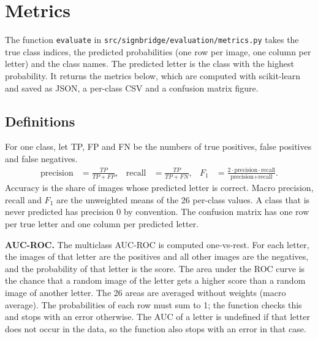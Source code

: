 \section{Metrics}
\label{sec:metrics}

The function \texttt{evaluate} in \texttt{src/signbridge/evaluation/metrics.py} takes the true class indices, the predicted probabilities (one row per image, one column per letter) and the class names. The predicted letter is the class with the highest probability. It returns the metrics below, which are computed with scikit-learn and saved as JSON, a per-class CSV and a confusion matrix figure.

\subsection{Definitions}

For one class, let TP, FP and FN be the numbers of true positives, false positives and false negatives.
\begin{align*}
  \text{precision} &= \frac{TP}{TP + FP}, &
  \text{recall} &= \frac{TP}{TP + FN}, &
  F_1 &= \frac{2 \cdot \text{precision} \cdot \text{recall}}{\text{precision} + \text{recall}}.
\end{align*}
Accuracy is the share of images whose predicted letter is correct. Macro precision, recall and $F_1$ are the unweighted means of the 26 per-class values. A class that is never predicted has precision 0 by convention. The confusion matrix has one row per true letter and one column per predicted letter.

\textbf{AUC-ROC.} The multiclass AUC-ROC is computed one-vs-rest. For each letter, the images of that letter are the positives and all other images are the negatives, and the probability of that letter is the score. The area under the ROC curve is the chance that a random image of the letter gets a higher score than a random image of another letter. The 26 areas are averaged without weights (macro average). The probabilities of each row must sum to 1; the function checks this and stops with an error otherwise. The AUC of a letter is undefined if that letter does not occur in the data, so the function also stops with an error in that case.

